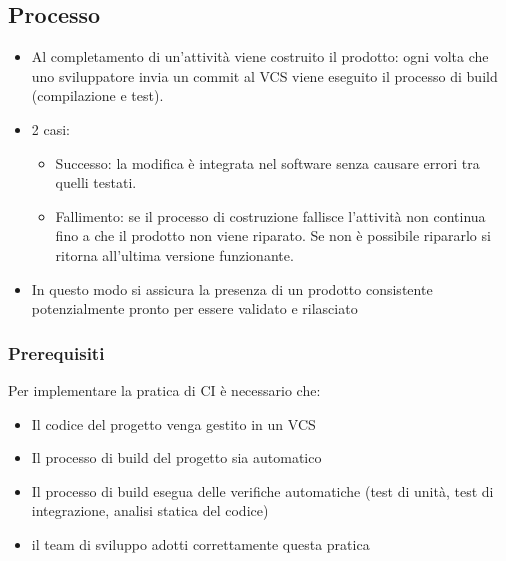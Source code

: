 \subsection{Processo}
\begin{itemize}
    \item Al completamento di un'attività viene costruito il prodotto: ogni volta che uno sviluppatore invia un commit al VCS viene eseguito il processo di build (compilazione e test).
    \item 2 casi:
    \begin{itemize}
        \item Successo: la modifica è integrata nel software senza causare errori tra quelli testati.
        \item Fallimento: se il processo di costruzione fallisce l'attività non continua fino a che il prodotto non viene riparato. Se non è possibile ripararlo si ritorna all’ultima versione funzionante.
    \end{itemize}
    \item In questo modo si assicura la presenza di un prodotto consistente potenzialmente pronto per essere validato e rilasciato
\end{itemize}

\subsubsection{Prerequisiti}
Per implementare la pratica di CI è necessario che:
\begin{itemize}
    \item Il codice del progetto venga gestito in un VCS
    \item Il processo di build del progetto sia automatico
    \item Il processo di build esegua delle verifiche automatiche (test di unità, test di integrazione, analisi statica del codice)
    \item il team di sviluppo adotti correttamente questa pratica
\end{itemize}

